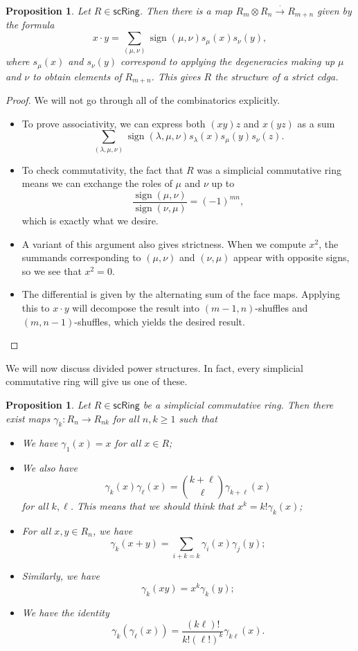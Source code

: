 \documentclass[10pt, oneside]{memoir}
\newtheorem{prop}[thm]{Proposition}
\theoremstyle{definition}
\theoremstyle{remark}
\theoremstyle{plain}
\theoremstyle{definition}
\theoremstyle{remark}
\newcommand{\on}[1]{\operatorname{#1}}
\newcommand{\ms}[1]{\mathsf{#1}}
\newcommand{\1}{\mathbf{1}}
\newcommand{\2}{\mathbf{2}}
\newcommand{\3}{\mathbf{3}}
\begin{document}
\begin{prop}
    Let $R \in \ms{scRing}$. Then there is a map \(R_m \otimes R_n \xrightarrow{\cdot} R_{m+n}\) given by the formula
    \[ x \cdot y = \sum_{(\mu, \nu)} \on{sign}(\mu, \nu) s_{\mu}(x) s_{\nu}(y), \]
    where \(s_{\mu}(x)\) and \(s_{\nu}(y)\) correspond to applying the degeneracies making up $\mu$ and $\nu$ to obtain elements of $R_{m+n}$. This gives $R$ the structure of a strict cdga.
\end{prop}

\begin{proof}
    We will not go through all of the combinatorics explicitly.
    \begin{itemize}
        \item To prove associativity, we can express both \((xy)z\) and \(x(yz)\) as a sum
        \[ \sum_{(\lambda,\mu, \nu)}\on{sign}(\lambda, \mu, \nu) s_{\lambda}(x) s_{\mu}(y) s_{\nu}(z). \]
        \item To check commutativity, the fact that $R$ was a simplicial commutative ring means we can exchange the roles of $\mu$ and $\nu$ up to 
        \[ \frac{\on{sign}(\mu, \nu)}{\on{sign}(\nu, \mu)} = (-1)^{mn}, \]
        which is exactly what we desire.
        \item A variant of this argument also gives strictness. When we compute $x^2$, the summands corresponding to $(\mu, \nu)$ and $(\nu, \mu)$ appear with opposite signs, so we see that $x^2 = 0$.
        \item The differential is given by the alternating sum of the face maps. Applying this to $x \cdot y$ will decompose the result into $(m-1, n)$-shuffles and $(m, n-1)$-shuffles, which yields the desired result. \qedhere
    \end{itemize}
\end{proof}

We will now discuss divided power structures. In fact, every simplicial commutative ring will give us one of these.

\begin{prop}
    Let $R \in \ms{scRing}$ be a simplicial commutative ring. Then there exist maps $\gamma_k \colon R_n \to R_{nk}$ for all $n, k \geq 1$ such that
    \begin{itemize}
        \item We have $\gamma_1(x) = x$ for all $x \in R$;
        \item We also have 
        \[ \gamma_k(x) \gamma_{\ell}(x) = \binom{k+\ell}{\ell} \gamma_{k+\ell}(x) \] 
        for all $k, \ell$. This means that we should think that $x^k = k! \gamma_k(x)$;
        \item For all $x,y \in R_n$, we have
        \[ \gamma_k(x+y) = \sum_{i+k=k} \gamma_i(x) \gamma_j(y); \]
        \item Similarly, we have
        \[ \gamma_k(xy) = x^k \gamma_k(y); \]
        \item We have the identity
        \[ \gamma_k (\gamma_{\ell}(x)) = \frac{(k\ell)!}{k! (\ell!)^k} \gamma_{k\ell}(x). \]
    \end{itemize}
\end{prop}
\end{document}
